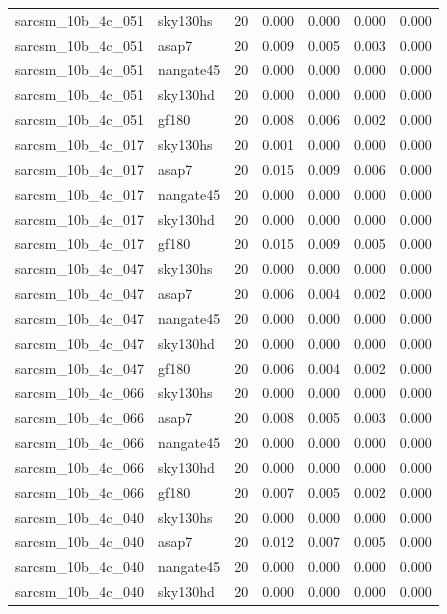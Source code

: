 \begin{tabular}{llrrrrr}
sarcsm\_10b\_4c\_051 & sky130hs & 20 & 0.000 & 0.000 & 0.000 & 0.000 \\
sarcsm\_10b\_4c\_051 & asap7 & 20 & 0.009 & 0.005 & 0.003 & 0.000 \\
sarcsm\_10b\_4c\_051 & nangate45 & 20 & 0.000 & 0.000 & 0.000 & 0.000 \\
sarcsm\_10b\_4c\_051 & sky130hd & 20 & 0.000 & 0.000 & 0.000 & 0.000 \\
sarcsm\_10b\_4c\_051 & gf180 & 20 & 0.008 & 0.006 & 0.002 & 0.000 \\
sarcsm\_10b\_4c\_017 & sky130hs & 20 & 0.001 & 0.000 & 0.000 & 0.000 \\
sarcsm\_10b\_4c\_017 & asap7 & 20 & 0.015 & 0.009 & 0.006 & 0.000 \\
sarcsm\_10b\_4c\_017 & nangate45 & 20 & 0.000 & 0.000 & 0.000 & 0.000 \\
sarcsm\_10b\_4c\_017 & sky130hd & 20 & 0.000 & 0.000 & 0.000 & 0.000 \\
sarcsm\_10b\_4c\_017 & gf180 & 20 & 0.015 & 0.009 & 0.005 & 0.000 \\
sarcsm\_10b\_4c\_047 & sky130hs & 20 & 0.000 & 0.000 & 0.000 & 0.000 \\
sarcsm\_10b\_4c\_047 & asap7 & 20 & 0.006 & 0.004 & 0.002 & 0.000 \\
sarcsm\_10b\_4c\_047 & nangate45 & 20 & 0.000 & 0.000 & 0.000 & 0.000 \\
sarcsm\_10b\_4c\_047 & sky130hd & 20 & 0.000 & 0.000 & 0.000 & 0.000 \\
sarcsm\_10b\_4c\_047 & gf180 & 20 & 0.006 & 0.004 & 0.002 & 0.000 \\
sarcsm\_10b\_4c\_066 & sky130hs & 20 & 0.000 & 0.000 & 0.000 & 0.000 \\
sarcsm\_10b\_4c\_066 & asap7 & 20 & 0.008 & 0.005 & 0.003 & 0.000 \\
sarcsm\_10b\_4c\_066 & nangate45 & 20 & 0.000 & 0.000 & 0.000 & 0.000 \\
sarcsm\_10b\_4c\_066 & sky130hd & 20 & 0.000 & 0.000 & 0.000 & 0.000 \\
sarcsm\_10b\_4c\_066 & gf180 & 20 & 0.007 & 0.005 & 0.002 & 0.000 \\
sarcsm\_10b\_4c\_040 & sky130hs & 20 & 0.000 & 0.000 & 0.000 & 0.000 \\
sarcsm\_10b\_4c\_040 & asap7 & 20 & 0.012 & 0.007 & 0.005 & 0.000 \\
sarcsm\_10b\_4c\_040 & nangate45 & 20 & 0.000 & 0.000 & 0.000 & 0.000 \\
sarcsm\_10b\_4c\_040 & sky130hd & 20 & 0.000 & 0.000 & 0.000 & 0.000 \\

\end{tabular}
